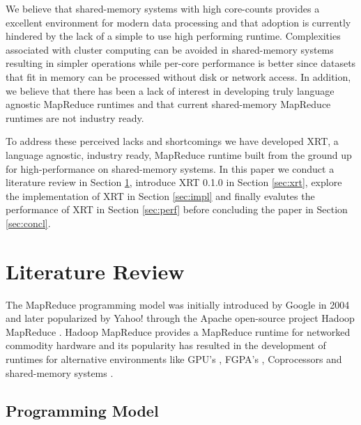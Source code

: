 \documentclass[twocolumn,11px]{article}       %
\begin{document}
We believe that shared-memory systems with high core-counts provides a excellent environment for modern data processing and that adoption is currently hindered by the lack of a simple to use high performing runtime.
Complexities associated with cluster computing can be avoided in shared-memory systems resulting in simpler operations while per-core performance is better since datasets that fit in memory can be processed without disk or network access.
In addition, we believe that there has been a lack of interest in developing truly language agnostic MapReduce runtimes and that current shared-memory MapReduce runtimes are not industry ready.

To address these perceived lacks and shortcomings we have developed XRT, a language agnostic, industry ready, MapReduce runtime built from the ground up for high-performance on shared-memory systems.
In this paper we conduct a literature review in Section \ref{sec:litrev}, introduce XRT 0.1.0 in Section \ref{sec:xrt}, explore the implementation of XRT in Section \ref{sec:impl} and finally evalutes the performance of XRT in Section \ref{sec:perf} before concluding the paper in Section \ref{sec:concl}.



\section{Literature Review} \label{sec:litrev}

The MapReduce programming model was initially introduced by Google in 2004 \cite{GoogleMapReduce} and later popularized by Yahoo! through the Apache open-source project Hadoop MapReduce \cite{Hadoop}.
Hadoop MapReduce provides a MapReduce runtime for networked commodity hardware and its popularity has resulted in the development of runtimes for alternative environments like GPU’s \cite{Mars}, FGPA's \cite{Melia}, Coprocessors \cite{MrPhi} and shared-memory systems \cite{Phoenix} \cite{Phoenix++} \cite{CilkMR} \cite{Metis} \cite{Ostrich}.

\subsection{Programming Model}
\end{document}
